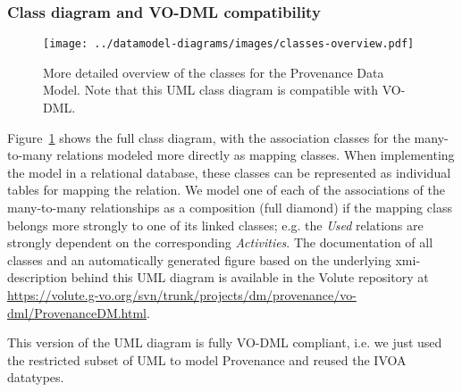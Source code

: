 \subsubsection{Class diagram and VO-DML compatibility}
\begin{figure}[h]
\centering
\texttt{[image: ../datamodel-diagrams/images/classes-overview.pdf]}
\caption[Detailed UML class diagramm, compatible with VO-DML]{More detailed
overview of the classes for the Provenance Data Model. Note that this UML class
diagram is %
compatible with VO-DML.}
\label{fig:classdiagram}
\end{figure}

Figure~\ref{fig:classdiagram} shows the full class diagram, with the association
classes for the many-to-many relations modeled more directly as mapping classes.
When implementing the model in a relational database, these classes can be
represented as individual tables for mapping the relation. We model one of each
of the associations of the many-to-many relationships as a composition (full
diamond) if the mapping class belongs more strongly to one of its linked
classes; e.g. the \emph{Used} relations are strongly dependent on the
corresponding \emph{Activities}. The documentation of all classes and an
automatically generated figure based on the underlying xmi-description behind
this UML diagram is available in the Volute repository at
\url{https://volute.g-vo.org/svn/trunk/projects/dm/provenance/vo-dml/ProvenanceDM.html}.

This version of the UML diagram is fully VO-DML compliant, i.e. we just used the restricted subset of UML to model
Provenance and reused the IVOA datatypes.


